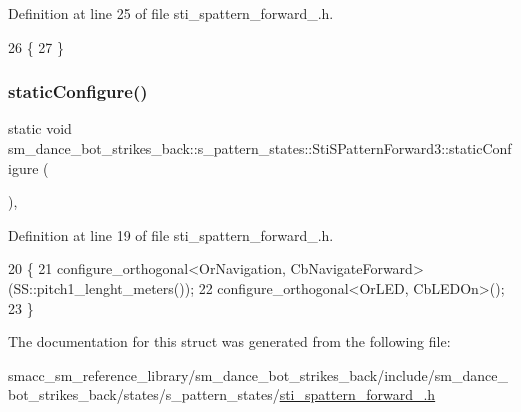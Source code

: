Definition at line 25 of file sti\+\_\+spattern\+\_\+forward\+\_.\+h.


\begin{DoxyCode}
26   \{
27   \}
\end{DoxyCode}
\mbox{\label{structsm__dance__bot__strikes__back_1_1s__pattern__states_1_1StiSPatternForward3_aa2535a3e18bc65c6272df046f9f0b4bb}} 
\subsubsection{\texorpdfstring{static\+Configure()}{staticConfigure()}}
{\footnotesize\ttfamily static void sm\+\_\+dance\+\_\+bot\+\_\+strikes\+\_\+back\+::s\+\_\+pattern\+\_\+states\+::\+Sti\+S\+Pattern\+Forward3\+::static\+Configure (\begin{DoxyParamCaption}{ }\end{DoxyParamCaption})\hspace{0.3cm}{\ttfamily [inline]}, {\ttfamily [static]}}



Definition at line 19 of file sti\+\_\+spattern\+\_\+forward\+\_.\+h.


\begin{DoxyCode}
20   \{
21     configure\_orthogonal<OrNavigation, CbNavigateForward>(SS::pitch1\_lenght\_meters());
22     configure\_orthogonal<OrLED, CbLEDOn>();
23   \}
\end{DoxyCode}


The documentation for this struct was generated from the following file\+:\begin{DoxyCompactItemize}
\item 
smacc\+\_\+sm\+\_\+reference\+\_\+library/sm\+\_\+dance\+\_\+bot\+\_\+strikes\+\_\+back/include/sm\+\_\+dance\+\_\+bot\+\_\+strikes\+\_\+back/states/s\+\_\+pattern\+\_\+states/\hyperlink{sm__dance__bot__strikes__back_2include_2sm__dance__bot__strikes__back_2states_2s__pattern__states_2sti__spattern__forward__3_8h}{sti\+\_\+spattern\+\_\+forward\+\_.\+h}\end{DoxyCompactItemize}

